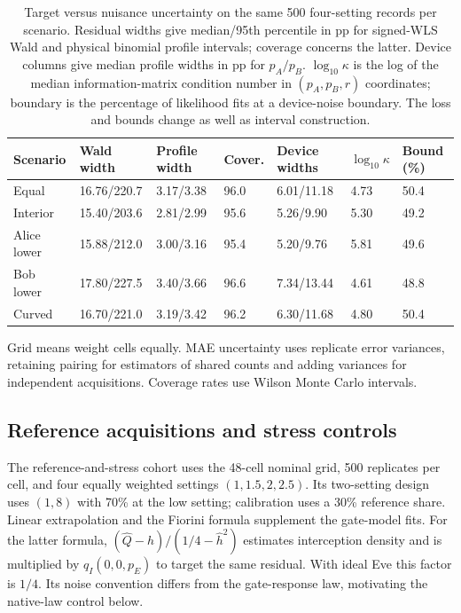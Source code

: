 \begin{table}[!htbp]
\centering
\small\setlength{\tabcolsep}{4pt}
\caption{Target versus nuisance uncertainty on the same 500 four-setting records per scenario. Residual widths give median/95th percentile in pp for signed-WLS Wald and physical binomial profile intervals; coverage concerns the latter. Device columns give median profile widths in pp for $p_A/p_B$. $\log_{10}\kappa$ is the log of the median information-matrix condition number in $(p_A,p_B,r)$ coordinates; boundary is the percentage of likelihood fits at a device-noise boundary. The loss and bounds change as well as interval construction.}
\label{tab:profiles}
\begin{tabular}{@{}lllllll@{}}
\toprule
Scenario & Wald width & Profile width & Cover. & Device widths & $\log_{10}\kappa$ & Bound (\%) \\
\midrule
Equal & 16.76/220.7 & 3.17/3.38 & 96.0 & 6.01/11.18 & 4.73 & 50.4 \\
Interior & 15.40/203.6 & 2.81/2.99 & 95.6 & 5.26/9.90 & 5.30 & 49.2 \\
Alice lower & 15.88/212.0 & 3.00/3.16 & 95.4 & 5.20/9.76 & 5.81 & 49.6 \\
Bob lower & 17.80/227.5 & 3.40/3.66 & 96.6 & 7.34/13.44 & 4.61 & 48.8 \\
Curved & 16.70/221.0 & 3.19/3.42 & 96.2 & 6.30/11.68 & 4.80 & 50.4 \\
\bottomrule
\end{tabular}
\end{table}

Grid means weight cells equally. MAE uncertainty uses replicate error variances,
retaining pairing for estimators of shared counts and adding variances for
independent acquisitions. Coverage rates use Wilson Monte Carlo intervals.


\subsection{Reference acquisitions and stress controls}
The reference-and-stress cohort uses the 48-cell nominal grid, 500 replicates per
cell, and four equally weighted settings $(1,1.5,2,2.5)$. Its two-setting design
uses $(1,8)$ with 70\% at the low setting; calibration uses a 30\% reference share.
Linear extrapolation and the Fiorini formula supplement the gate-model fits.
For the latter formula, $(\widehat Q-\widehat h)/(1/4-\widehat h^2)$ estimates
interception density and is multiplied by $q_I(0,0,p_E)$ to target the same
residual. With ideal Eve this factor is $1/4$. Its noise convention differs from
the gate-response law, motivating the native-law control below.

